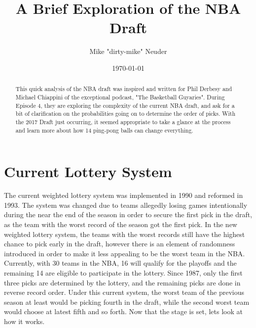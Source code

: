 \documentclass[letterpaper,12pt]{article}
\begin{document}
\title{A Brief Exploration of the NBA Draft}
\author{Mike "dirty-mike" Neuder}
\date{\today}
\maketitle

\begin{abstract}
This quick analysis of the NBA draft was inspired and written for Phil Derbesy and Michael Chiappini of the exceptional podcast, "The Basketball Guyaries". During Episode 4, they are exploring the complexity of the current NBA draft, and ask for a bit of clarification on the probabilities going on to determine the order of picks. With the 2017 Draft just occurring, it seemed appropriate to take a glance at the process and learn more about how 14 ping-pong balls can change everything.
\end{abstract}

\section{Current Lottery System}
The current weighted lottery system was implemented in 1990 and reformed in 1993. The system was changed due to teams allegedly losing games intentionally during the near the end of the season in order to secure the first pick in the draft, as the team with the worst record of the season got the first pick. In the new weighted lottery system, the teams with the worst records still have the highest chance to pick early in the draft, however there is an element of randomness introduced in order to make it less appealing to be the worst team in the NBA. Currently, with 30 teams in the NBA, 16 will qualify for the playoffs and the remaining 14 are eligible to participate in the lottery. Since 1987, only the first three picks are determined by the lottery, and the remaining picks are done in reverse record order. Under this current system, the worst team of the previous season at least would be picking fourth in the draft, while the second worst team would choose at latest fifth and so forth. Now that the stage is set, lets look at how it works. 
\end{document}
